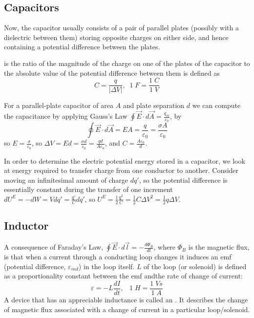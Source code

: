 \documentclass[12pt, a4paper, oneside, openright, titlepage]{book}
\begin{document}
\subsection{Capacitors}

Now, the capacitor usually consists of a pair of parallel plates (possibly with a dielectric between them) storing opposite charges on either side, and hence containing a potential difference between the plates.

\begin{defn}
     is the ratio of the magnitude of the charge on one of the plates of the capacitor to the absolute value of the potential difference between them is defined as \begin{equation*}
        C = \frac{q}{|\Delta V|},\;\;1\;F = \frac{1\;C}{1\;V}
    \end{equation*}
\end{defn}
For a parallel-plate capacitor of area $A$ and plate separation $d$ we can compute the capacitance by applying Gauss's Law $\oint\vec{E}\cdot d\vec{A} = \frac{q_{in}}{\varepsilon_0}$, by $$\oint\vec{E}\cdot d\vec{A} = EA = \frac{q}{\varepsilon_0} = \frac{\sigma A}{\varepsilon_0}$$ so $E = \frac{\sigma}{\varepsilon_0}$, so $\Delta V = Ed = \frac{\sigma d}{\varepsilon_0} = \frac{qd}{A\varepsilon_0}$, and $C = \frac{A\varepsilon_0}{d}$.

In order to determine the electric potential energy stored in a capacitor, we look at energy required to transfer charge from one conductor to another. Consider moving an infinitesimal amount of charge $dq'$, so the potential difference is essentially constant during the transfer of one increment $dU^E = -dW = Vdq' = \frac{q'}{C}dq'$, so $U^E = \frac{1}{2}\frac{q^2}{C} = \frac{1}{2}C\Delta V^2 = \frac{1}{2}q\Delta V$.

\subsection{Inductor}

A consequence of Faraday's Law, $\oint \vec{E}\cdot d\vec{l} = -\frac{d\Phi_B}{dt}$, where $\Phi_B$ is the magnetic flux, is that when a current through a conducting loop changes it induces an emf (potential difference, $\varepsilon_{ind}$) in the loop itself.  $L$ of the loop (or solenoid) is defined as a proportionality constant between the emf andthe rate of change of current: $$\varepsilon = -L\frac{dI}{dt},\;\;\;1\;H = \frac{1\;Vs}{1\;A}$$
A device that has an appreciable inductance is called an . It describes the change of magnetic flux associated with a change of current in a particular loop/solenoid.
\end{document}
